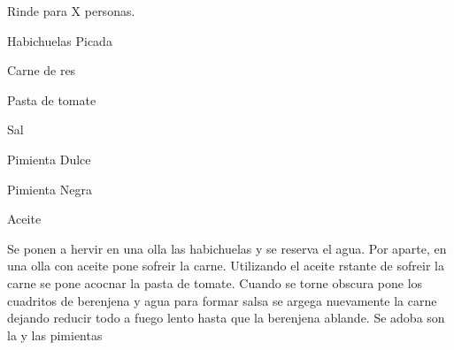 
Rinde para X personas.

\begin{ingredientes}
\item Habichuelas Picada
\item Carne de res
\item Pasta de tomate
\item Sal
\item Pimienta Dulce
\item Pimienta Negra
\item Aceite
\end{ingredientes}
\preparacion

Se ponen a hervir en una olla las habichuelas y se reserva el agua. Por aparte, en una olla con aceite pone sofreir la carne. Utilizando el aceite rstante de sofreir la carne se pone acocnar la pasta de tomate. Cuando se torne obscura pone los cuadritos de berenjena y agua para formar salsa se argega nuevamente la carne dejando reducir todo a fuego lento hasta que la berenjena ablande. Se adoba son la y las pimientas


